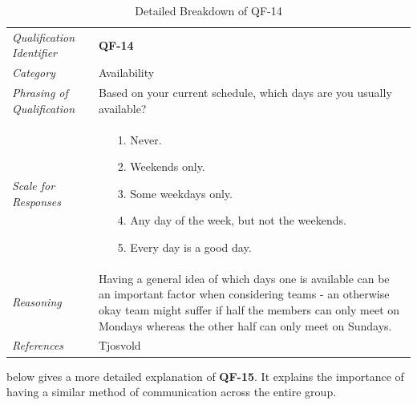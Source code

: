 \documentclass[12pt,letterpaper]{article}
\begin{document}
\begin{table}[H]
	\caption{Detailed Breakdown of QF-14}
	\begin{tabu} to 
		\toprule
		Qualification Identifier & {\bf QF-14}\\
		Category & Availability \\
		Phrasing of Qualification & Based on your current schedule, which days are you usually available? \\
		Scale for Responses &
		\begin{minipage}[t]{\linewidth}
			\begin{enumerate}
				\item[1.] Never.
				\item[2.] Weekends only.
				\item[3.] Some weekdays only.
				\item[4.] Any day of the week, but not the weekends.
				\item[5.] Every day is a good day.
			\end{enumerate}
		\end{minipage}\\
		Reasoning & Having a general idea of which days one is available can be an important factor when considering teams - an otherwise okay team might suffer if half the members can only meet on Mondays whereas the other half can only meet on Sundays.\\
		References & Tjosvold\cite{tjosvold}\\
		\toprule
	\end{tabu}
\end{table}

\newpage{}

 below gives a more detailed explanation of {\bf QF-15}. It explains the importance of having a similar method of communication across the entire group.
\end{document}
